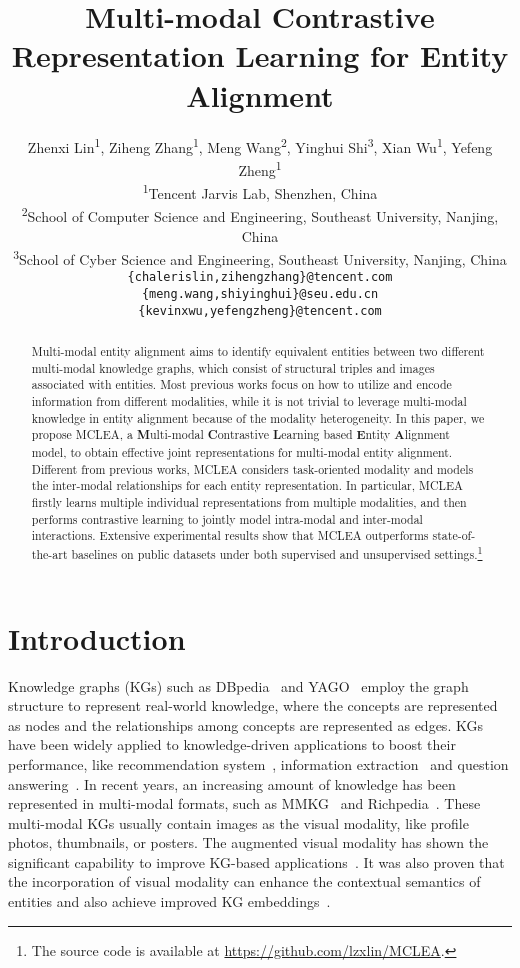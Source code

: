 \documentclass[11pt]{article}
\title{Multi-modal Contrastive Representation Learning for Entity Alignment}
\author{
Zhenxi Lin\textsuperscript{\rm 1},
Ziheng Zhang\textsuperscript{\rm 1},
Meng Wang\textsuperscript{\rm 2},
Yinghui Shi\textsuperscript{\rm 3},
Xian Wu\textsuperscript{\rm 1},
Yefeng Zheng\textsuperscript{\rm 1} \\
\textsuperscript{\rm 1}Tencent Jarvis Lab, Shenzhen, China \\
\textsuperscript{\rm 2}School of Computer Science and Engineering, Southeast University, Nanjing, China\\
\textsuperscript{\rm 3}School of Cyber Science and Engineering, Southeast University, Nanjing, China \\
\normalsize{\texttt{\{chalerislin,zihengzhang\}@tencent.com}} \\
\normalsize{\texttt{\{meng.wang,shiyinghui\}@seu.edu.cn}} \\
\normalsize{\texttt{\{kevinxwu,yefengzheng\}@tencent.com}}
}
\begin{document}
\maketitle

\begin{abstract}

Multi-modal entity alignment aims to identify equivalent entities between two different multi-modal knowledge graphs, which consist of structural triples and images associated with entities.
Most previous works focus on how to utilize and encode information from different modalities, while it is not trivial to leverage multi-modal knowledge in entity alignment because of the modality heterogeneity.
In this paper, we propose MCLEA, a \textbf{M}ulti-modal \textbf{C}ontrastive \textbf{L}earning based \textbf{E}ntity \textbf{A}lignment model, to obtain effective joint representations for multi-modal entity alignment.
Different from previous works, MCLEA considers task-oriented modality and models the inter-modal relationships for each entity representation. In particular, MCLEA firstly learns multiple individual representations from multiple modalities, and then performs contrastive learning to jointly model intra-modal and inter-modal interactions.
Extensive experimental results show that MCLEA outperforms state-of-the-art baselines on public datasets under both supervised and unsupervised settings.\footnote{The source code is available at \url{https://github.com/lzxlin/MCLEA}.}

\end{abstract} 
\section{Introduction}

Knowledge graphs (KGs) such as DBpedia~\cite{lehmann2015dbpedia} and YAGO~\cite{mahdisoltani2014yago3} employ the graph structure to represent real-world knowledge, where the concepts are represented as nodes and the relationships among concepts are represented as edges.
KGs have been widely applied to knowledge-driven applications to boost their performance, like 
recommendation system~\cite{cao2019unifying}, information extraction~\cite{han2018neural} and question answering~\cite{ijcai2021p611}.
In recent years, an increasing amount of knowledge has been represented in multi-modal formats, such as MMKG~\cite{liu2019mmkg} and Richpedia~\cite{wang2020richpedia}. These multi-modal KGs usually contain images as the visual modality, like profile photos, thumbnails, or posters. The augmented visual modality has shown the significant capability to improve KG-based applications~\cite{chen2020mmea}.
It was also proven that the incorporation of visual modality can enhance the contextual semantics of entities and also achieve improved KG embeddings~\cite{wang2021visual}.
\end{document}
